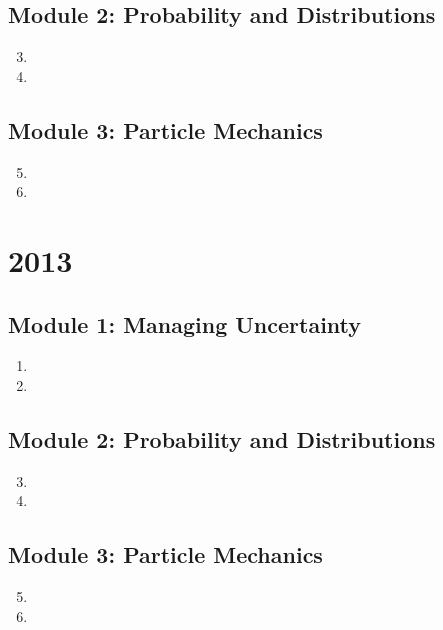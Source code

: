 \documentclass[fleqn,titlepage]{book}
\numberwithin{equation}{section}
\theoremstyle{plain}
\theoremstyle{definition}
\theoremstyle{remark}
\begin{document}
\section{Module 2: Probability and Distributions}
\begin{enumerate}[label=\bfseries  \arabic*.]\setcounter{enumi}{2}
\item 
\item 
\end{enumerate}
\section{Module 3: Particle Mechanics}
\begin{enumerate}[label=\bfseries  \arabic*.]\setcounter{enumi}{4}
\item 
\item 
\end{enumerate}

\chapter{2013}
\section{Module 1: Managing Uncertainty}
\begin{enumerate}[label=\bfseries  \arabic*.]\setcounter{enumi}{0}
\item 
\item 
\end{enumerate}
\section{Module 2: Probability and Distributions}
\begin{enumerate}[label=\bfseries  \arabic*.]\setcounter{enumi}{2}
\item 
\item 
\end{enumerate}
\section{Module 3: Particle Mechanics}
\begin{enumerate}[label=\bfseries  \arabic*.]\setcounter{enumi}{4}
\item 
\item 
\end{enumerate}
\end{document}
